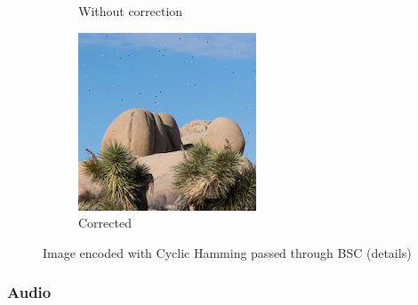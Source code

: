 \documentclass{article}
\begin{document}
\begin{figure}
\begin{subfigure}[b]{0.32\textwidth}
        \caption{Without correction}
        \label{fig:cropped-image-cyclic-bsc-no-correction}
    \end{subfigure}
    \hfill
    \begin{subfigure}[b]{0.32\textwidth}
        \centering
        \includegraphics[width=\textwidth]{../Result/cropped-cyclic-bsc-output-syndrome-corrected.png}
        \caption{Corrected}
        \label{fig:cropped-image-cyclic-bsc-syndrome-corrected}
    \end{subfigure}
       \caption{Image encoded with Cyclic Hamming passed through BSC (details)}
       \label{fig:cropped-image-cyclic-bsc}
\end{figure}






\subsubsection{Audio}
\end{document}

